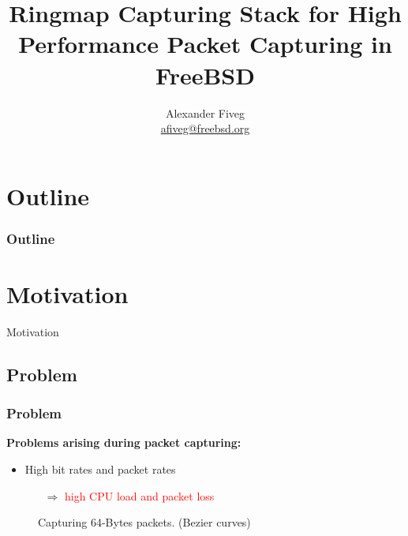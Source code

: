 \documentclass{beamer}
\title{Ringmap Capturing Stack for High Performance Packet Capturing in FreeBSD}
\author[Alexander Fiveg]{ Alexander Fiveg \\
\url{afiveg@freebsd.org} }
\begin{document}
\frame{\titlepage}

\section*{Outline}

\begin{frame}
\frametitle{Outline}
\tableofcontents
\end{frame}




\section{Motivation}

\begin{frame}
	\begin{center}
	\huge{Motivation}
	\end{center}
\end{frame}

\subsection*{Problem}
\begin{frame}
\frametitle{Problem}
\textbf{Problems arising during packet capturing:}
\begin{itemize}
	\item High bit rates and packet rates
		\begin{itemize}
			\item [$\Rightarrow$] \textcolor{red}{high CPU load and packet loss} \newline
		\end{itemize}
\end{itemize}
\begin{figure}[H] 
	\caption{Capturing 64-Bytes packets. (Bezier curves)}
\end{figure}
\end{frame}
\end{document}
